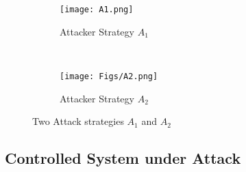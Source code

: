 \begin{example}

\end{example}

\begin{figure}[thpb]
\begin{subfigure}[t]{0.45\columnwidth}
\centering
\texttt{[image: A1.png]}
\caption{Attacker Strategy $A_1$}
\label{fig:A1}
\end{subfigure}
\ 
\begin{subfigure}[t]{0.45\columnwidth}
\centering
\texttt{[image: Figs/A2.png]}
\caption{Attacker Strategy $A_2$}
\label{fig:A2}
\end{subfigure}
\caption{Two Attack strategies $A_1$ and $A_2$}
\label{fig:attack-strategies}
\vspace{-2em}
\end{figure}

\subsection{Controlled System under Attack}

